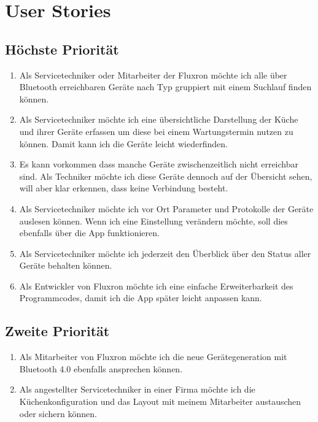 
\section{User Stories}
\label{sec:User Stories}

\subsection{Höchste Priorität}
\label{subsec:Höchste Priorität}
\begin{enumerate}
\item Als Servicetechniker oder Mitarbeiter der Fluxron möchte ich alle über Bluetooth erreichbaren Geräte nach Typ gruppiert mit einem Suchlauf finden können.
\item Als Servicetechniker möchte ich eine übersichtliche Darstellung der Küche und ihrer Geräte erfassen um diese bei einem Wartungstermin nutzen zu können. Damit kann ich die Geräte leicht wiederfinden.
\item Es kann vorkommen dass manche Geräte zwischenzeitlich nicht erreichbar sind. Als Techniker möchte ich diese Geräte dennoch auf der Übersicht sehen, will aber klar erkennen, dass keine Verbindung besteht.
\item Als Servicetechniker möchte ich vor Ort Parameter und Protokolle der Geräte auslesen können. Wenn ich eine Einstellung verändern möchte, soll dies ebenfalls über die App funktionieren.
\item Als Servicetechniker möchte ich jederzeit den Überblick über den Status aller Geräte behalten können.
\item Als Entwickler von Fluxron möchte ich eine einfache Erweiterbarkeit des Programmcodes, damit ich die App später leicht anpassen kann.
\end{enumerate}

\subsection{Zweite Priorität}
\label{subsec:Zweite Priorität}

\begin{enumerate}[resume]
\item Als Mitarbeiter von Fluxron möchte ich die neue Gerätegeneration mit Bluetooth 4.0 ebenfalls ansprechen können.
\item Als angestellter Servicetechniker in einer Firma möchte ich die Küchenkonfiguration und das Layout mit meinem Mitarbeiter austauschen oder sichern können.
\end{enumerate}

